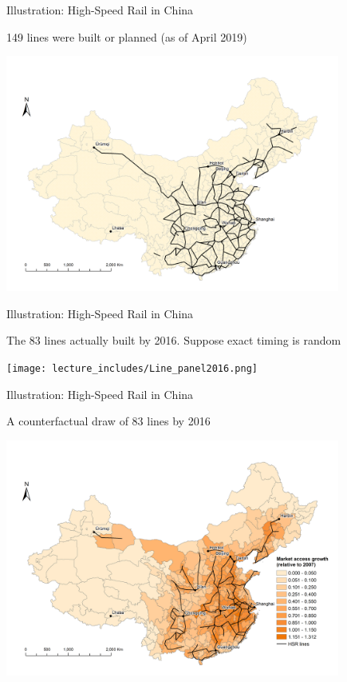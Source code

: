 \documentclass{beamer}
\begin{document}
\begin{frame}[t]{Illustration: High-Speed Rail in China} 
\vspace{-0.3cm}
	\begin{center}
		149 lines were built or planned (as of April 2019)

		\includegraphics[trim={1cm 0.5cm 0.5cm 1cm},clip,width=11cm]{lecture_includes/Lines_actual_planned_nocolor.png}
	\end{center}
\end{frame}

\begin{frame}[t]{Illustration: High-Speed Rail in China} 
\vspace{-0.3cm}
	\begin{center}
		The 83 lines actually built by 2016. Suppose exact timing is random

		\texttt{[image: lecture\_includes/Line\_panel2016.png]}
	\end{center}
\end{frame}

\begin{frame}[t]{Illustration: High-Speed Rail in China} 
\vspace{-0.3cm}
	\begin{center}
		A counterfactual draw of 83 lines by 2016

		\includegraphics[trim={1cm 0.5cm 0.5cm 1cm},clip,width=11cm]{lecture_includes/Sim_Line_nlink2016.png}
	\end{center}
\end{frame}
\end{document}
